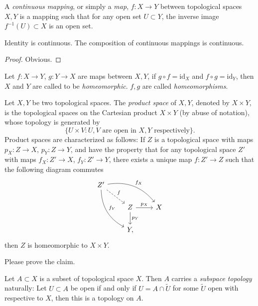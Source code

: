 \begin{defn}
    A \emph{continuous mapping}, or simply a \emph{map}, $f:X\to Y$ between topological spaces $X,Y$ is a mapping such that for any open set $U\subset Y$, the inverse image $f^{-1}(U)\subset X$ is an open set.
\end{defn}

\begin{lem}\label{lem:category}
    Identity is continuous.
    The composition of continuous mappings is continuous.
\end{lem}
\begin{proof}
    Obvious.
\end{proof}

\begin{defn}
    Let $f:X\to Y$, $g:Y\to X$ are maps between $X,Y$, if $g\circ f=\mathrm{id}_X$ and $f\circ g=\mathrm{id}_Y$, then $X$ and $Y$ are called to be \emph{homeomorphic}.
    $f,g$ are called \emph{homeomorphisms}.
\end{defn}

\begin{eg}\label{eg:product space}
    Let $X,Y$ be two topological spaces.
    The \emph{product space} of $X,Y$, denoted by $X\times Y$, is the topological spaces on the Cartesian product $X\times Y$ (by abuse of notation), whose topology is generated by
    \[\{U\times V\colon U,V\text{ are open in }X,Y\text{ respectively}\}.\]
    Product spaces are characterized as follows:
    If $Z$ is a topological space with maps $p_X:Z\to X$, $p_Y:Z\to Y$, and have the property that for any topological space $Z'$ with maps $f_X:Z'\to X$, $f_Y:Z'\to Y$, there exists a unique map $f:Z'\to Z$ such that the following diagram commutes
    \[\begin{tikzcd}
        Z' \ar[drr, bend left, "{f_X}"] \ar[ddr, bend right, "{f_Y}"] \ar[dr, dashed, "f"] & \ & \ \\
        \ & Z \ar[r, "{p_X}"] \ar[d, "{p_Y}"] & X \\
        \ & Y, & \
    \end{tikzcd}\]
    then $Z$ is homeomorphic to $X\times Y$.
\end{eg}

Please prove the claim.

\begin{eg}\label{eg:subspace}
    Let $A\subset X$ is a subset of topological space $X$.
    Then $A$ carries a \emph{subspace topology} naturally:
    Let $U\subset A$ be open if and only if $U=A\cap\tilde{U}$ for some $\tilde{U}$ open with respective to $X$, then this is a topology on $A$.
\end{eg}

